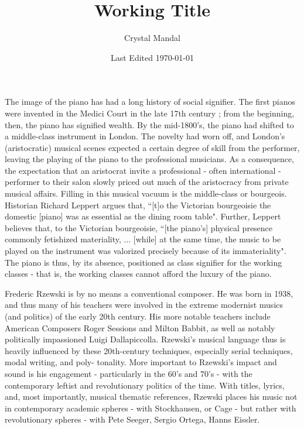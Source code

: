 \documentclass[12pt, letterpaper]{article}
\title{\vspace*{-72pt} Working Title}
\author{Crystal Mandal}
\date{Last Edited \today}
\begin{document}
  \maketitle


  The image of the piano has had a long history of social signifier.
  The first pianos were invented in the Medici Court in the late 17th
  century \autocite*{piano-social-history} ; from the beginning, then, the piano has signified wealth.
  By the mid-1800's, the piano had shifted to a middle-class instrument in London. The novelty had
  worn off, and London's (aristocratic) musical scenes expected a certain degree of skill from the
  performer, leaving the playing of the piano to the professional musicians. As a consequence, the
  expectation that an aristocrat invite a professional - often international - performer to their
  salon slowly priced out much of the aristocracy from private musical
  affairs.\autocite*[61]{london-social-piano} Filling in this musical vacuum is the middle-class or
  bourgeois. Historian Richard Leppert argues that, ``[t]o the Victorian bourgeoisie the
  domestic [piano] was as essential as the dining room table".\autocite*[153]{sight-of-sound}
  Further, Leppert believes that, to the Victorian bourgeoisie, ``[the piano's] physical
  presence commonly fetishized materiality, ... [while] at the same time, the music to
be played on the instrument was valorized precisely because of its
immateriality".\autocite*[155]{sight-of-sound}
The piano is thus, by its absence, positioned as class signifier for the working classes -
that is, the working classes cannot afford the luxury of the piano.

Frederic Rzewski is by no means a conventional composer. He was born in 1938, and thus many
of his teachers were involved in the extreme modernist musics (and politics) of the early
20th century. His more notable teachers include American Composers Roger Sessions
and Milton Babbit, as well as notably politically impassioned Luigi Dallapiccolla. Rzewski's
musical language thus is heavily influenced by these 20th-century techniques, especially
serial techniques, modal writing, and poly\*- tonality. More important to Rzewski's impact
and sound is his engagement - particularly in the 60's and 70's - with the contemporary
leftist and revolutionary politics of the time. With titles, lyrics, and, most importantly,
musical thematic references, Rzewski places his music not in contemporary academic spheres -
with Stockhausen, or Cage - but rather with revolutionary spheres - with Pete Seeger, Sergio
Ortega, Hanns Eissler.
\end{document}
